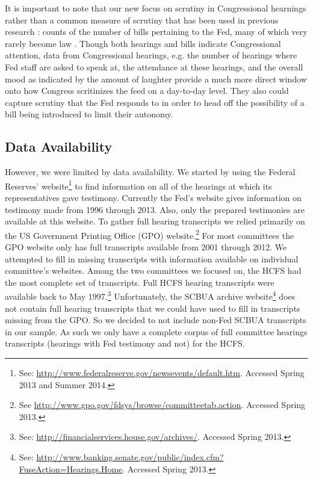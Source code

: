 \documentclass[a4paper]{article}\usepackage[]{graphicx}\usepackage[]{color}
\begin{document}
It is important to note that our new focus on scrutiny in Congressional hearnings rather than a common measure of scrutiny that has been used in previous research  \citep[e.g.][]{Kettl1988}: counts of the number of bills pertaining to the Fed, many of which very rarely become law \citep{Binder2014}. Though both hearings and bills indicate Congressional attention, data from Congressional hearings, e.g. the number of hearings where Fed staff are asked to speak at, the attendance at these hearings, and the overall mood as indicated by the amount of laughter provide a much more direct window onto how Congress scritinizes the feed on a day-to-day level. They also could capture scrutiny that the Fed responds to in order to head off the possibility of a bill being introduced to limit their autonomy.

\subsection{Data Availability}

However, we were limited by data availability. We started by using the Federal Reserves' website\footnote{See: \url{http://www.federalreserve.gov/newsevents/default.htm}. Accessed Spring 2013 and Summer 2014.} to find information on all of the hearings at which its representatives gave testimony. Currently the Fed's website gives information on testimony made from 1996 through 2013. Also, only the prepared testimonies are available at this website. To gather full hearing transcripts we relied primarily on the US Government Printing Office (GPO) website.\footnote{See \url{http://www.gpo.gov/fdsys/browse/committeetab.action}. Accessed Spring 2013.} For most committees the GPO website only has full transcripts available from 2001 through 2012. We attempted to fill in missing transcripts with information available on individual committee's websites. Among the two committees we focused on, the HCFS had the most complete set of transcripts. Full HCFS hearing transcripts were available back to May 1997.\footnote{See: \url{http://financialservices.house.gov/archives/}. Accessed Spring 2013.} Unfortunately, the SCBUA archive website\footnote{See: \url{http://www.banking.senate.gov/public/index.cfm?FuseAction=Hearings.Home}. Accessed Spring 2013.} does not contain full hearing transcripts that we could have used to fill in transcripts missing from the GPO. So we decided to not include non-Fed SCBUA transcripts in our sample. As such we only have a complete corpus of full committee hearings transcripts (hearings with Fed testimony and not) for the HCFS.
\end{document}
